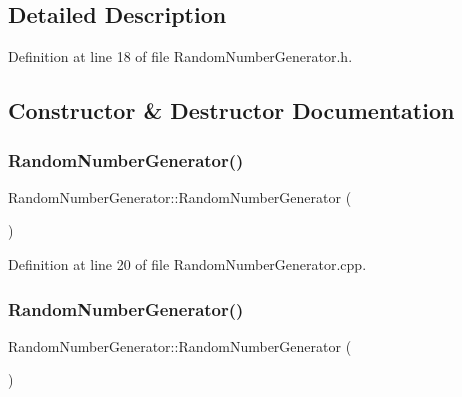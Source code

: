 \subsection{Detailed Description}


Definition at line 18 of file Random\+Number\+Generator.\+h.



\subsection{Constructor \& Destructor Documentation}
\mbox{\label{class_random_number_generator_a8e7e711ea58f13f3ed95becbe33684e9}} 
\subsubsection{Random\+Number\+Generator()\hspace{0.1cm}{\footnotesize\ttfamily [1/2]}}
{\footnotesize\ttfamily Random\+Number\+Generator\+::\+Random\+Number\+Generator (\begin{DoxyParamCaption}{ }\end{DoxyParamCaption})\hspace{0.3cm}{\ttfamily [private]}}



Definition at line 20 of file Random\+Number\+Generator.\+cpp.

\mbox{\label{class_random_number_generator_a0007ec836f6bb43c27e2082264189c4c}} 
\subsubsection{Random\+Number\+Generator()\hspace{0.1cm}{\footnotesize\ttfamily [2/2]}}
{\footnotesize\ttfamily Random\+Number\+Generator\+::\+Random\+Number\+Generator (\begin{DoxyParamCaption}\item[{const \textbf{ Random\+Number\+Generator} \&}]{ }\end{DoxyParamCaption})\hspace{0.3cm}{\ttfamily [private]}}



